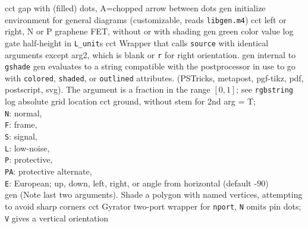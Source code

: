 %
  {cct}%
  {gap with (filled) dots, A=chopped arrow between dots}%
%
  {gen}%
  {initialize environment for general diagrams
    (customizable, reads {\tt libgen.m4})}%
%
  {cct}%
  {left or right, N or P graphene FET, without or with shading
    }%
%
  {gen}%
  {green color value}%
%
  {log}%
  {gate half-height in {\tt L\_unit}s}%
%
  {cct}%
  {Wrapper that calls {\tt source} with identical arguments except 
   arg2, which is blank or {\tt r} for right orientation.} 
%
  {gen}%
  {internal to {\tt gshade}}%
%
  {gen}%
  {evaluates to a string compatible with the postprocessor in use
   to go with {\tt colored}, {\tt shaded}, or {\tt outlined} attributes.
   (PSTricks, metapost, pgf-tikz, pdf, postscript, svg).
   The argument is a fraction in the range $[0,1]$; see {\tt rgbstring}}%
%
  {log}%
  {absolute grid location}%
%
  {cct}%
  { ground, without stem for 2nd arg = T;\\
    {\tt N}: normal,\\
    {\tt F}: frame,\\
    {\tt S}: signal,\\
    {\tt L}: low-noise,\\
    {\tt P}: protective,\\
    {\tt PA}: protective alternate,\\
    {\tt E}: European; up, down, left, right, or angle
    from horizontal (default -90) \\
   }%
%
  {gen}%
  {(Note last two arguments).  Shade a polygon with named
    vertices, attempting to avoid sharp corners}%
%
  {cct}%
  {Gyrator two-port wrapper for {\tt nport}, {\tt N} omits pin dots; {\tt V}
   gives a vertical orientation
   }%

